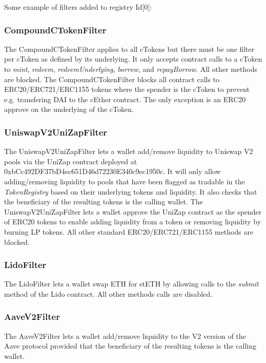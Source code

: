 \documentclass[12pt]{article}
\begin{document}
Some example of filters added to registry Id[0]:

\subsubsection{CompoundCTokenFilter}
The CompoundCTokenFilter applies to all cTokens but there must be one filter per cToken as defined by its underlying. It only accepts contract calls to a cToken to \textit{mint}, \textit{redeem}, \textit{redeemUnderlying}, \textit{borrow}, and \textit{repayBorrow}. All other methods are blocked.
The CompoundCTokenFilter blocks all contract calls to ERC20/ERC721/ERC1155 tokens where the spender is the cToken to prevent e.g. transfering DAI to the cEther contract. The only exception is an ERC20 approve on the underlying of the cToken.

\subsubsection{UniswapV2UniZapFilter}
The UniswapV2UniZapFilter lets a wallet add/remove liquidity to Uniswap V2 pools via the UniZap contract deployed at 0xbCc492DF37bD4ec651D46d72230E340c9ec1950c. It will only allow adding/removing liquidity to pools that have been flagged as tradable in the \textit{TokenRegistry} based on their underlying tokens and liquidity. It also checks that the beneficiary of the resulting tokens is the calling wallet.
The UniswapV2UniZapFilter lets a wallet approve the UniZap contract as the spender of ERC20 tokens to enable adding liquidity from a token or removing liquidity by burning LP tokens. All other standard ERC20/ERC721/ERC1155 methods are blocked.

\subsubsection{LidoFilter}
The LidoFilter lets a wallet swap ETH for stETH by allowing calls to the \textit{submit} method of the Lido contract. All other methods calls are disabled.

\subsubsection{AaveV2Filter}
The AaveV2Filter lets a wallet add/remove liquidity to the V2 version of the Aave protocol provided that the beneficiary of the resulting tokens is the calling wallet. 
\end{document}
